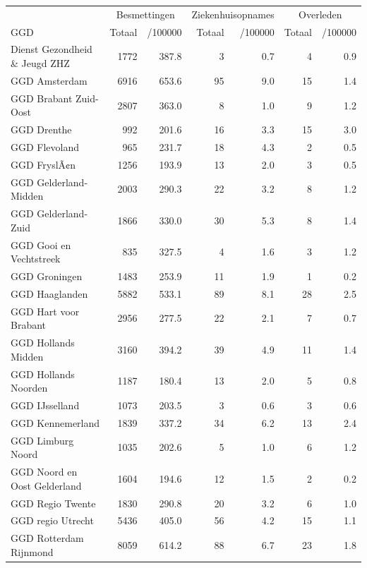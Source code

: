 \documentclass[
  english,
  man,floatsintext]{apa6}
\begin{document}
\begin{table}[H]
\centering\begingroup\fontsize{10}{12}\selectfont

\begin{threeparttable}
\begin{tabular}{lrrrrrr}
\toprule
\multicolumn{1}{c}{ } & \multicolumn{2}{c}{Besmettingen} & \multicolumn{2}{c}{Ziekenhuisopnames} & \multicolumn{2}{c}{Overleden} \\
\cmidrule(l{3pt}r{3pt}){2-3} \cmidrule(l{3pt}r{3pt}){4-5} \cmidrule(l{3pt}r{3pt}){6-7}
GGD & Totaal & /100000 & Totaal & /100000 & Totaal & /100000\\
\midrule
Dienst Gezondheid \& Jeugd ZHZ & 1772 & 387.8 & 3 & 0.7 & 4 & 0.9\\
GGD Amsterdam & 6916 & 653.6 & 95 & 9.0 & 15 & 1.4\\
GGD Brabant Zuid-Oost & 2807 & 363.0 & 8 & 1.0 & 9 & 1.2\\
GGD Drenthe & 992 & 201.6 & 16 & 3.3 & 15 & 3.0\\
GGD Flevoland & 965 & 231.7 & 18 & 4.3 & 2 & 0.5\\
GGD FryslÃ¢n & 1256 & 193.9 & 13 & 2.0 & 3 & 0.5\\
GGD Gelderland-Midden & 2003 & 290.3 & 22 & 3.2 & 8 & 1.2\\
GGD Gelderland-Zuid & 1866 & 330.0 & 30 & 5.3 & 8 & 1.4\\
GGD Gooi en Vechtstreek & 835 & 327.5 & 4 & 1.6 & 3 & 1.2\\
GGD Groningen & 1483 & 253.9 & 11 & 1.9 & 1 & 0.2\\
GGD Haaglanden & 5882 & 533.1 & 89 & 8.1 & 28 & 2.5\\
GGD Hart voor Brabant & 2956 & 277.5 & 22 & 2.1 & 7 & 0.7\\
GGD Hollands Midden & 3160 & 394.2 & 39 & 4.9 & 11 & 1.4\\
GGD Hollands Noorden & 1187 & 180.4 & 13 & 2.0 & 5 & 0.8\\
GGD IJsselland & 1073 & 203.5 & 3 & 0.6 & 3 & 0.6\\
GGD Kennemerland & 1839 & 337.2 & 34 & 6.2 & 13 & 2.4\\
GGD Limburg Noord & 1035 & 202.6 & 5 & 1.0 & 6 & 1.2\\
GGD Noord en Oost Gelderland & 1604 & 194.6 & 12 & 1.5 & 2 & 0.2\\
GGD Regio Twente & 1830 & 290.8 & 20 & 3.2 & 6 & 1.0\\
GGD regio Utrecht & 5436 & 405.0 & 56 & 4.2 & 15 & 1.1\\
GGD Rotterdam Rijnmond & 8059 & 614.2 & 88 & 6.7 & 23 & 1.8\\

\end{tabular}
\end{threeparttable}
\end{table}
\end{document}
